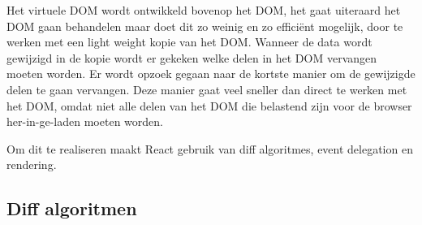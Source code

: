 	Het virtuele DOM wordt ontwikkeld bovenop het DOM, het gaat uiteraard het DOM gaan behandelen maar doet dit zo weinig en zo efficiënt mogelijk, door te werken met een light weight kopie van het DOM. Wanneer de data wordt gewijzigd in de kopie wordt er gekeken welke delen in het DOM vervangen moeten worden. Er wordt opzoek gegaan naar de kortste manier om de gewijzigde delen te gaan vervangen. Deze manier gaat veel sneller dan direct te werken met het DOM, omdat niet alle delen van het DOM die belastend zijn voor de browser her-in-ge-laden moeten worden.
	
	Om dit te realiseren maakt React gebruik van diff algoritmes, event delegation en rendering.
	
	\subsection{Diff algoritmen}
		
